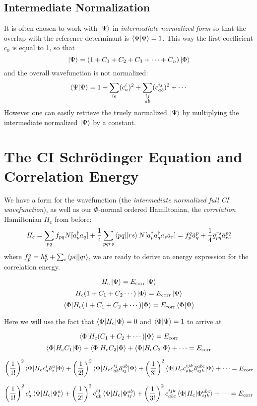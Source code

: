 \documentclass{article}
\newcommand{\lp}{\left(}
\newcommand{\rp}{\right)}
\newcommand{\Ecorr}{E_{\mathrm{corr}}}
\newcommand{\Hc}{H_{\mathrm{c}}}
\newcommand{\dg}{\ensuremath{^\dagger} }
\begin{document}
\subsection{Intermediate Normalization}
It is often chosen to work with $\ket{\Psi}$ in \textit{intermediate normalized form} so that the overlap with the reference determinant is $\braket{\Phi | \Psi} = 1$.  
This way the first coefficient $c_0$ is equal to 1, so that 
\[ \ket{\Psi} = \lp 1 + C_1 + C_2 + C_3 + \cdots + C_n \rp \ket{\Phi} \]
and the overall wavefunction is not normalized:
\[ \braket{\Psi|\Psi} = 1 + \sum_{ia} (c_a^i)^2 + \sum_{ \substack{ij \\ ab}} (c_{ab}^{ij})^2 + \cdots  \]
However one can easily retrieve the truely normalized $\ket{\Psi}$ by multiplying the intermediate normalized $\ket{\Psi}$ by a constant.


\section{The CI Schr{\"o}dinger Equation and Correlation Energy}
We have a form for the wavefunction (the \textit{intermediate normalized full CI wavefunction}), as well as our $\Phi$-normal ordered Hamiltonian, 
the \textit{correlation} Hamiltonian $\Hc$ from before:
\[\Hc =  \sum_{pq} f_{pq} N[a_p\dg a_q]  + \frac{1}{4} \sum_{pqrs} \braket{pq || rs} N[a_p\dg a_q\dg a_s a_r] = f_p^q \tilde{a}_q^p + \frac{1}{4} \bar{g}_{pq}^{rs} \tilde{a}_{rs}^{pq} \] 
where $f_{p}^{q} = h_{p}^{q} + \sum_i \braket{pi||qi} $,
we are ready to derive an energy expression for the correlation energy.

\[\Hc \ket{\Psi} = \Ecorr \ket{\Psi} \]
\[\Hc (1 + C_1 + C_2 \cdots) \ket{\Phi} = \Ecorr \ket{\Psi} \]
\[\braket{\Phi | \Hc (1 + C_1 + C_2 + \cdots) | \Phi} = \Ecorr \braket{\Phi|\Psi} \]

Here we will use the fact that  $\braket{\Phi|\Hc|\Phi} = 0 $ and $\braket{\Phi|\Psi} = 1$ to arrive at

\[\braket{\Phi | \Hc (C_1 + C_2 + \cdots) | \Phi} = \Ecorr \]
\[ \braket{\Phi | \Hc C_1 | \Phi} + \braket{\Phi | \Hc C_2 | \Phi} + \braket{\Phi | \Hc C_3 | \Phi} + \cdots = \Ecorr \]

\[ \left(\frac{1}{1!}\right)^2 \braket{\Phi | \Hc c_a^i \tilde{a}_i^a  | \Phi}
+  \left(\frac{1}{2!}\right)^2 \braket{\Phi | \Hc c_{ab}^{ij} \tilde{a}_{ij}^{ab} | \Phi}
+  \left(\frac{1}{3!}\right)^2 \braket{\Phi | \Hc c_{abc}^{ijk} \tilde{a}_{ijk}^{abc} |\Phi} + \cdots = \Ecorr
\]

\[ \left(\frac{1}{1!}\right)^2 c_a^i \braket{\Phi | \Hc | \Phi_i^a}
+  \left(\frac{1}{2!}\right)^2 c_{ab}^{ij} \braket{\Phi | \Hc | \Phi_{ij}^{ab}}
+  \left(\frac{1}{3!}\right)^2 c_{abc}^{ijk} \braket{\Phi | \Hc |\Phi_{ijk}^{abc}} + \cdots = \Ecorr
\]
\end{document}
